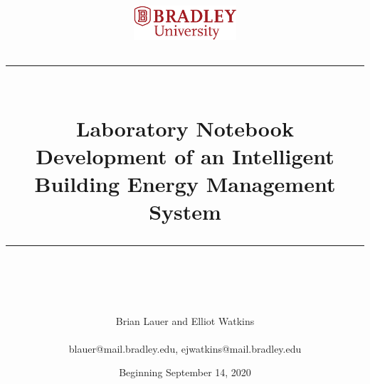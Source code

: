 \documentclass[fontsize=11pt, %
                             paper=letter, %
                             openany, %
                             captions=tableheading,
                             index=totoc,
                             hyperref]{labbook}
\newcommand{\HRule}{\rule{\linewidth}{0.5mm}} %
\begin{document}


%

\title{
\begin{center}
\href{http://www.bradley.edu}{\includegraphics[height=0.5in]{figs/logoBU1-Print}}
\vskip10pt
\HRule \\[0.4cm]
{\Huge \bfseries Laboratory Notebook \\[0.5cm] \Large Development of an Intelligent Building Energy Management System}\\[0.4cm] %
\HRule \\[1.5cm]
\end{center}
}
\author{\Huge Brian Lauer and \Huge Elliot Watkins \\ \\\Large blauer@mail.bradley.edu, ejwatkins@mail.bradley.edu} %
\date{Beginning September 14, 2020} %
\maketitle


\printindex
\tableofcontents %
\newpage %
\end{document}
